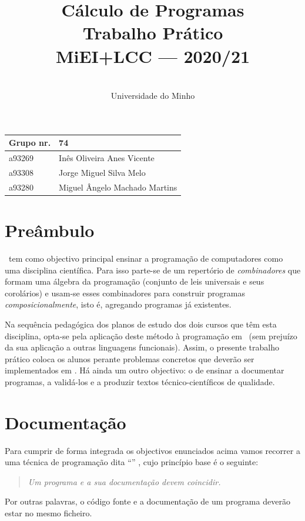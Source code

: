 \documentclass[a4paper]{article}
\title{
       	Cálculo de Programas
\\
       	Trabalho Prático
\\
       	MiEI+LCC --- 2020/21
}
\author{
       	\dium
\\
       	Universidade do Minho
}
\date\mydate
\begin{document}
\maketitle

\begin{center}\large
\begin{tabular}{ll}
\textbf{Grupo} nr. & 74
\\\hline
a93269 & Inês Oliveira Anes Vicente
\\
a93308 & Jorge Miguel Silva Melo
\\
a93280 & Miguel Ângelo Machado Martins
\end{tabular}
\end{center}

\section{Preâmbulo}

\CP\ tem como objectivo principal ensinar
a progra\-mação de computadores como uma disciplina científica. Para isso
parte-se de um repertório de \emph{combinadores} que formam uma álgebra da
programação (conjunto de leis universais e seus corolários) e usam-se esses
combinadores para construir programas \emph{composicionalmente}, isto é,
agregando programas já existentes.

Na sequência pedagógica dos planos de estudo dos dois cursos que têm
esta disciplina, opta-se pela aplicação deste método à programação
em \Haskell\ (sem prejuízo da sua aplicação a outras linguagens
funcionais). Assim, o presente trabalho prático coloca os
alunos perante problemas concretos que deverão ser implementados em
\Haskell.  Há ainda um outro objectivo: o de ensinar a documentar
programas, a validá-los e a produzir textos técnico-científicos de
qualidade.

\section{Documentação} Para cumprir de forma integrada os objectivos
enunciados acima vamos recorrer a uma técnica de programa\-ção dita
``'' \cite{Kn92}, cujo princípio base é o seguinte:
%
\begin{quote}\em Um programa e a sua documentação devem coincidir.
\end{quote}
%
Por outras palavras, o código fonte e a documentação de um
programa deverão estar no mesmo ficheiro.
\end{document}
